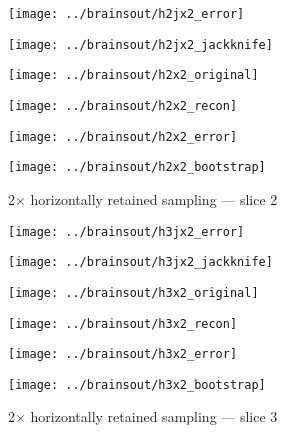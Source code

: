 \documentclass[review,supplement,onefignum,onetabnum,juq]{siamonline181217}
\begin{document}
\begin{figure}
\begin{centering}

\parbox{\imsize}{\texttt{[image: ../brainsout/h2jx2\_error]}}
\parbox{\imsize}{\texttt{[image: ../brainsout/h2jx2\_jackknife]}}

\vspace{\vertsep}

\parbox{\imsize}{\texttt{[image: ../brainsout/h2x2\_original]}}
\parbox{\imsize}{\texttt{[image: ../brainsout/h2x2\_recon]}}

\vspace{\vertsep}

\parbox{\imsize}{\texttt{[image: ../brainsout/h2x2\_error]}}
\parbox{\imsize}{\texttt{[image: ../brainsout/h2x2\_bootstrap]}}

\end{centering}
\caption{2$\times$ horizontally retained sampling --- slice 2}
\end{figure}


\begin{figure}
\begin{centering}

\parbox{\imsize}{\texttt{[image: ../brainsout/h3jx2\_error]}}
\parbox{\imsize}{\texttt{[image: ../brainsout/h3jx2\_jackknife]}}

\vspace{\vertsep}

\parbox{\imsize}{\texttt{[image: ../brainsout/h3x2\_original]}}
\parbox{\imsize}{\texttt{[image: ../brainsout/h3x2\_recon]}}

\vspace{\vertsep}

\parbox{\imsize}{\texttt{[image: ../brainsout/h3x2\_error]}}
\parbox{\imsize}{\texttt{[image: ../brainsout/h3x2\_bootstrap]}}

\end{centering}
\caption{2$\times$ horizontally retained sampling --- slice 3}
\end{figure}
\end{document}
